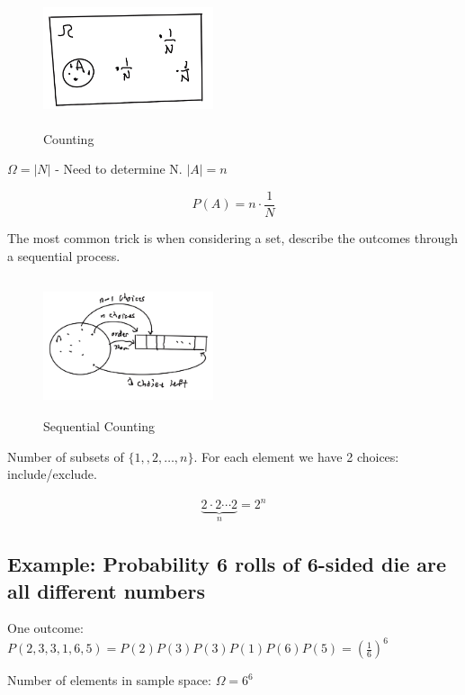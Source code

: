 
\begin{figure}[ht]
\centering
\includegraphics[width=5cm, height=4cm]{images/L04/counting.jpeg}
\caption{Counting}
\end{figure}

$\Omega=|N|$ - Need to determine N.
$|A|=n$

$$
P(A)=n\cdot \frac{1}{N}
$$

 The most common trick is when considering a set, describe the outcomes through a sequential process.

\begin{figure}[ht]
\centering
\includegraphics[width=5cm, height=4cm]{images/L04/seq_counting.jpeg}
\caption{Sequential Counting}
\end{figure}


Number of subsets of $\{1,,2, \ldots, n\}$.  For each element we have 2 choices: include/exclude.

\begin{align*}
    \underbrace{2\cdot 2\cdots 2}_{n} = 2^n
\end{align*}

\subsection{Example: Probability 6 rolls of 6-sided die are all different numbers}


One outcome: $P(2,3,3,1,6,5)=P(2)P(3)P(3)P(1)P(6)P(5)=(\frac{1}{6})^6$

Number of elements in sample space: $\Omega=6^6$


